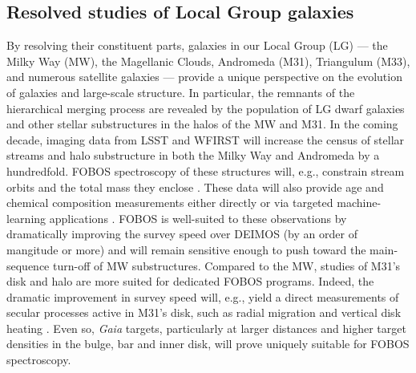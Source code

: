 
\subsection{Resolved studies of Local Group galaxies}
\label{sec:localgroup}

By resolving their constituent parts, galaxies in our Local Group
(LG) --- the Milky Way (MW), the Magellanic Clouds, Andromeda (M31),
Triangulum (M33), and numerous satellite galaxies
--- provide a unique perspective on the evolution of galaxies and
large-scale structure. In particular, the remnants of the
hierarchical merging process are revealed by the population of LG
dwarf galaxies and other stellar substructures in the halos of the MW
and M31. In the coming decade, imaging data from LSST and WFIRST will
increase the census of stellar streams and halo substructure in both
the Milky Way and Andromeda by a hundredfold. FOBOS spectroscopy of
these structures will, e.g., constrain stream orbits and the total
mass they enclose \citep{2017ApJ...836..234S}. These data will also
provide age and chemical composition measurements either directly or
via targeted machine-learning applications \citep[see Section
\ref{sec:datascience};][]{2015ApJ...808...16N, 2018arXiv180401530T,
2018arXiv180803278T}. FOBOS is well-suited to these observations by
dramatically improving the survey speed over DEIMOS (by an order of
mangitude or more) and will remain sensitive enough to push toward
the main-sequence turn-off of MW substructures. Compared to the MW,
studies of M31's disk and halo are more suited for dedicated FOBOS
programs. Indeed, the dramatic improvement in survey speed will,
e.g., yield a direct measurements of secular processes active in
M31's disk, such as radial migration and vertical disk heating
\citep{2013ApJ...779..103D, 2015ApJ...803...24D,
2019ApJ...871...11Q}. Even so, {\it Gaia} targets, particularly at
larger distances and higher target densities in the bulge, bar and
inner disk, will prove uniquely suitable for FOBOS spectroscopy.




